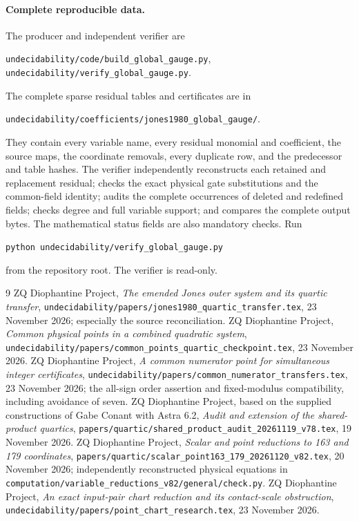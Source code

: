 \documentclass[11pt]{article}
\begin{document}
\paragraph{Complete reproducible data.}
The producer and independent verifier are
\begin{center}\small
\nolinkurl{undecidability/code/build_global_gauge.py},\\
\nolinkurl{undecidability/verify_global_gauge.py}.
\end{center}
The complete sparse residual tables and certificates are in
\begin{center}\small
\nolinkurl{undecidability/coefficients/jones1980_global_gauge/}.
\end{center}
They contain every variable name, every residual monomial and
coefficient, the source maps, the coordinate removals, every duplicate
row, and the predecessor and table hashes. The verifier independently
reconstructs each retained and replacement residual; checks the exact
physical gate substitutions and the common-field identity; audits the
complete occurrences of deleted and redefined fields; checks degree
and full variable support; and compares the complete output bytes.
The mathematical status fields are also mandatory checks. Run
\begin{center}\small
\texttt{python undecidability/verify\_global\_gauge.py}
\end{center}
from the repository root. The verifier is read-only.

\begin{thebibliography}{9}
 ZQ Diophantine Project,
\emph{The emended Jones outer system and its quartic transfer},
\nolinkurl{undecidability/papers/jones1980_quartic_transfer.tex},
23 November 2026; especially the source reconciliation.
 ZQ Diophantine Project,
\emph{Common physical points in a combined quadratic system},
\nolinkurl{undecidability/papers/common_points_quartic_checkpoint.tex},
23 November 2026.
 ZQ Diophantine Project,
\emph{A common numerator point for simultaneous integer certificates},
\nolinkurl{undecidability/papers/common_numerator_transfers.tex},
23 November 2026; the all-sign order assertion and fixed-modulus
compatibility, including avoidance of seven.
 ZQ Diophantine Project, based on the supplied
constructions of Gabe Conant with Astra 6.2,
\emph{Audit and extension of the shared-product quartics},
\nolinkurl{papers/quartic/shared_product_audit_20261119_v78.tex},
19 November 2026.
 ZQ Diophantine Project,
\emph{Scalar and point reductions to 163 and 179 coordinates},
\nolinkurl{papers/quartic/scalar_point163_179_20261120_v82.tex},
20 November 2026; independently reconstructed physical equations in
\nolinkurl{computation/variable_reductions_v82/general/check.py}.
 ZQ Diophantine Project,
\emph{An exact input-pair chart reduction and its contact-scale obstruction},
\nolinkurl{undecidability/papers/point_chart_research.tex},
23 November 2026.
\end{thebibliography}
\end{document}
